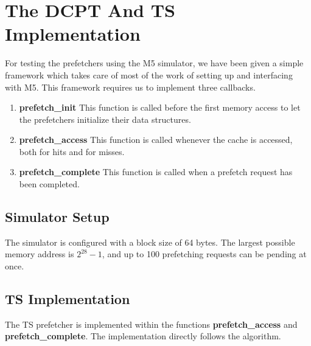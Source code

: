 \section{The DCPT And TS Implementation}
\label{section:scheme}

For testing the prefetchers using the M5 simulator, we have been given a simple
framework which takes care of most of the work of setting up and interfacing with
M5. This framework requires us to implement three callbacks.

\begin{enumerate}
	\item \textbf{prefetch\_init}
		This function is called before the first memory access to let the
		prefetchers initialize their data structures.
	\item \textbf{prefetch\_access}
		This function is called whenever the cache is accessed, both for hits
		and for misses.
	\item \textbf{prefetch\_complete}
		This function is called when a prefetch request has been completed.
\end{enumerate}

\subsection{Simulator Setup}


The simulator is configured with a block size of 64 bytes. The largest possible
memory address is $2^{28}-1$, and up to 100 prefetching requests can be pending
at once.


\subsection{TS Implementation}

The TS prefetcher is implemented within the functions \textbf{prefetch\_access}
and \textbf{prefetch\_complete}. The implementation directly follows the
algorithm.


